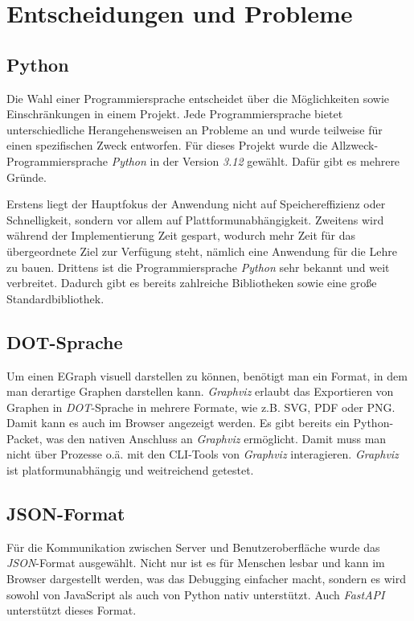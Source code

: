 \section{Entscheidungen und Probleme}\label{sec:entscheidungenundprobleme}

\subsection{Python}

Die Wahl einer Programmiersprache entscheidet über die Möglichkeiten sowie Einschränkungen in einem Projekt.
Jede Programmiersprache bietet unterschiedliche Herangehensweisen an Probleme an und wurde teilweise für einen spezifischen Zweck entworfen.
Für dieses Projekt wurde die Allzweck-Programmiersprache \textit{Python} in der Version \textit{3.12} gewählt.
Dafür gibt es mehrere Gründe. 

\noindent Erstens liegt der Hauptfokus der Anwendung nicht auf Speichereffizienz oder Schnelligkeit, sondern vor allem auf Plattformunabhängigkeit.
Zweitens wird während der Implementierung Zeit gespart, wodurch mehr Zeit für das übergeordnete Ziel zur Verfügung steht, nämlich eine Anwendung
für die Lehre zu bauen.
Drittens ist die Programmiersprache \textit{Python} sehr bekannt und weit verbreitet. Dadurch gibt es bereits zahlreiche Bibliotheken sowie eine große
Standardbibliothek.

\subsection{DOT-Sprache}

Um einen EGraph visuell darstellen zu können, benötigt man ein Format, in dem man derartige Graphen darstellen kann. 
\textit{Graphviz} erlaubt das Exportieren von Graphen in \textit{DOT}-Sprache in mehrere Formate, wie z.B. SVG, PDF oder PNG. 
Damit kann es auch im Browser angezeigt werden.
Es gibt bereits ein Python-Packet, was den nativen Anschluss an \textit{Graphviz} ermöglicht. Damit muss man nicht über Prozesse o.ä. mit den CLI-Tools
von \textit{Graphviz} interagieren.
\textit{Graphviz} ist platformunabhängig und weitreichend getestet.

\subsection{JSON-Format}

Für die Kommunikation zwischen Server und Benutzeroberfläche wurde das \textit{JSON}-Format ausgewählt. Nicht nur ist es für Menschen lesbar und kann im Browser dargestellt werden,
was das Debugging einfacher macht, sondern es wird sowohl von JavaScript als auch von Python nativ unterstützt. Auch \textit{FastAPI} unterstützt dieses Format.

